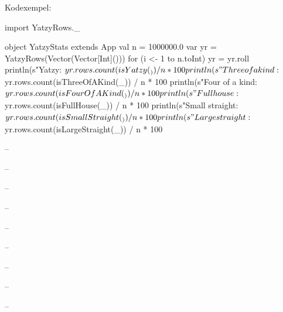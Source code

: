 Kodexempel:
\begin{CodeSmall}
import YatzyRows._

object YatzyStats extends App {
  val n = 1000000.0
  var yr = YatzyRows(Vector(Vector[Int]()))
  for (i <- 1 to n.toInt) yr = yr.roll
  println(s"Yatzy: ${yr.rows.count(isYatzy(_)) / n * 100}%
  println(s"Three of a kind: ${yr.rows.count(isThreeOfAKind(_)) / n * 100}%
  println(s"Four of a kind: ${yr.rows.count(isFourOfAKind(_)) / n * 100}%
  println(s"Full house: ${yr.rows.count(isFullHouse(_)) / n * 100}%
  println(s"Small straight: ${yr.rows.count(isSmallStraight(_)) / n * 100}%
  println(s"Large straight: ${yr.rows.count(isLargeStraight(_)) / n * 100}%
}
\end{CodeSmall}

\Subtask -- 


\Task     %

\Subtask -- %


\Task     %

\Subtask -- %

\Subtask -- %

\Subtask -- %

\Subtask -- %

\Subtask -- %

\Subtask -- %


\Task     %

\Subtask -- %
